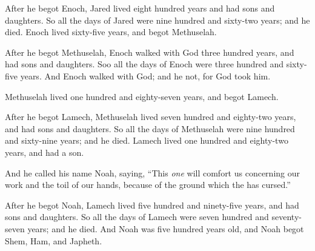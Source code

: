 \bverse After he begot Enoch, Jared lived eight hundred years and had sons and daughters.
\bverse So all the days of Jared were nine hundred and sixty-two years; and he died.
\bverse Enoch lived sixty-five years, and begot Methuselah.
	
\bverse After he begot Methuselah, Enoch walked with God three hundred years, and had sons and daughters.
\bverse Soo all the days of Enoch were three hundred and sixty-five years.
\bverse And Enoch walked with God; and he \was not, for God took him.

\bverse Methuselah lived one hundred and eighty-seven years, and begot Lamech.
	
\bverse After he begot Lamech, Methuselah lived seven hundred and eighty-two years, and had sons and daughters.
\bverse So all the days of Methuselah were nine hundred and sixty-nine years; and he died.
\bverse Lamech lived one hundred and eighty-two years, and had a son.
	
\bverse And he called his name Noah, saying, ``This \textit{one} will comfort us concerning our work and the toil of our hands, because of the ground which the \lord has cursed.''
	
\bverse After he begot Noah, Lamech lived five hundred and ninety-five years, and had sons and daughters.
\bverse So all the days of Lamech were seven hundred and seventy-seven years; and he died.
\bverse And Noah was five hundred years old, and Noah begot Shem, Ham, and Japheth.




